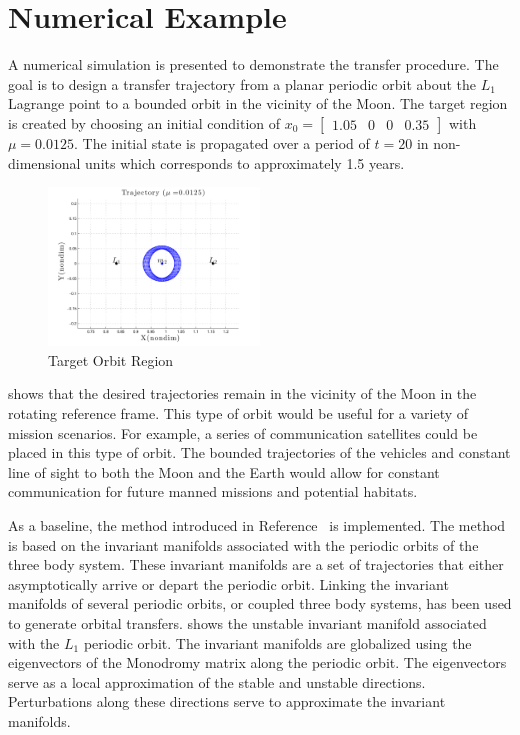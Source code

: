 \section{Numerical Example}\label{sec:simulation}
A numerical simulation is presented to demonstrate the transfer procedure.
The goal is to design a transfer trajectory from a planar periodic orbit about the \( L_1\) Lagrange point to a bounded orbit in the vicinity of the Moon.
The target region is created by choosing an initial condition of \( x_0 = \begin{bmatrix}1.05 & 0 & 0 & 0.35 \end{bmatrix} \) with \( \mu = 0.0125 \).
The initial state is propagated over a period of \( t = \num{20} \) in non-dimensional units which corresponds to approximately \num{1.5} years.
\begin{figure}[htbp]
   \centering
   \includegraphics[width=0.5\textwidth]{figures/2015_SSPI/moon_orbit} %
   \caption{Target Orbit Region}
   \label{fig:moon_orbit}
\end{figure}
 shows that the desired trajectories remain in the vicinity of the Moon in the rotating reference frame. 
This type of orbit would be useful for a variety of mission scenarios.
For example, a series of communication satellites could be placed in this type of orbit. 
The bounded trajectories of the vehicles and constant line of sight to both the Moon and the Earth would allow for constant communication for future manned missions and potential habitats.

As a baseline, the method introduced in Reference~\cite{koon2000} is implemented.
The method is based on the invariant manifolds associated with the periodic orbits of the three body system.
These invariant manifolds are a set of trajectories that either asymptotically arrive or depart the periodic orbit. 
Linking the invariant manifolds of several periodic orbits, or coupled three body systems, has been used to generate orbital transfers.
 shows the unstable invariant manifold associated with the \( L_1\) periodic orbit. 
The invariant manifolds are globalized using the eigenvectors of the Monodromy matrix along the periodic orbit.
The eigenvectors serve as a local approximation of the stable and unstable directions. 
Perturbations along these directions serve to approximate the invariant manifolds.

